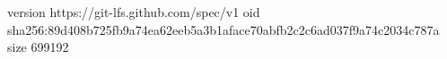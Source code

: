 version https://git-lfs.github.com/spec/v1
oid sha256:89d408b725fb9a74ea62eeb5a3b1aface70abfb2c2c6ad037f9a74c2034c787a
size 699192
